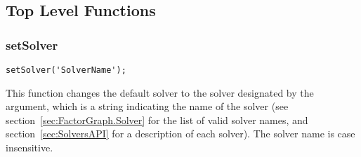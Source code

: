 \subsection{Top Level Functions}

\subsubsection{setSolver}

\begin{lstlisting}
setSolver('SolverName');
\end{lstlisting}

This function changes the default solver to the solver designated by the argument, which is a string indicating the name of the solver (see section~\ref{sec:FactorGraph.Solver} for the list of valid solver names, and section~\ref{sec:SolversAPI} for a description of each solver).  The solver name is case insensitive.